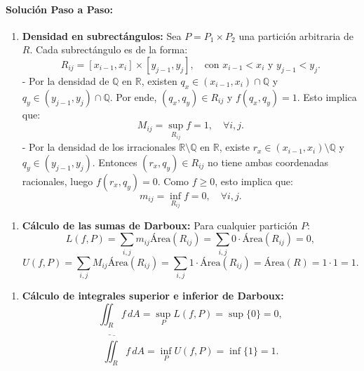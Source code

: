 \documentclass[11pt,a4paper]{article}
\begin{document}
\paragraph{Solución Paso a Paso:}\par
\begin{enumerate}[label=\textbf{\arabic*.}]
\item \textbf{Densidad en subrectángulos:}
Sea $P = P_1 \times P_2$ una partición arbitraria de $R$. Cada subrectángulo es de la forma:
\begin{equation*}
R_{ij} = [x_{i-1}, x_i] \times [y_{j-1}, y_j], \quad \text{con } x_{i-1} < x_i \text{ y } y_{j-1} < y_j.
\end{equation*}
- Por la densidad de $\mathbb{Q}$ en $\mathbb{R}$, existen $q_x \in (x_{i-1}, x_i) \cap \mathbb{Q}$ y $q_y \in (y_{j-1}, y_j) \cap \mathbb{Q}$.
Por ende, $(q_x, q_y) \in R_{ij}$ y $f(q_x, q_y) = 1$.
Esto implica que:
\begin{equation*}
M_{ij} = \sup_{R_{ij}} f = 1, \quad \forall i, j.
\end{equation*}
- Por la densidad de los irracionales $\mathbb{R} \setminus \mathbb{Q}$ en $\mathbb{R}$, existe $r_x \in (x_{i-1}, x_i) \setminus \mathbb{Q}$ y $q_y \in (y_{j-1}, y_j)$.
Entonces $(r_x, q_y) \in R_{ij}$ no tiene ambas coordenadas racionales, luego $f(r_x, q_y) = 0$.
Como $f \ge 0$, esto implica que:
\begin{equation*}
m_{ij} = \inf_{R_{ij}} f = 0, \quad \forall i, j.
\end{equation*}
\end{enumerate}

\begin{enumerate}[label=\textbf{\arabic*.}]
\item \textbf{Cálculo de las sumas de Darboux:}
Para cualquier partición $P$:
\begin{equation*}
L(f, P) = \sum_{i,j} m_{ij} \text{Área}(R_{ij}) = \sum_{i,j} 0 \cdot \text{Área}(R_{ij}) = 0,
\end{equation*}
\begin{equation*}
U(f, P) = \sum_{i,j} M_{ij} \text{Área}(R_{ij}) = \sum_{i,j} 1 \cdot \text{Área}(R_{ij}) = \text{Área}(R) = 1 \cdot 1 = 1.
\end{equation*}
\end{enumerate}

\begin{enumerate}[label=\textbf{\arabic*.}]
\item \textbf{Cálculo de integrales superior e inferior de Darboux:}
\begin{equation*}
\underline{\iint_R} f \, dA = \sup_P L(f, P) = \sup \{0\} = 0,
\end{equation*}
\begin{equation*}
\overline{\iint_R} f \, dA = \inf_P U(f, P) = \inf \{1\} = 1.
\end{equation*}
\end{enumerate}
\end{document}
